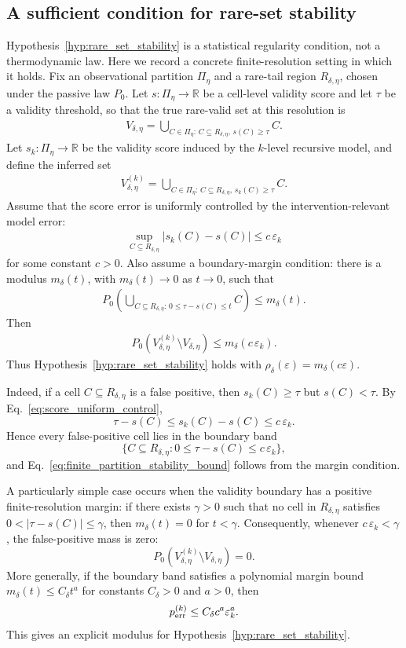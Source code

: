 \documentclass[
  aps,
  prresearch,
  reprint,
  amsmath,
  amssymb,
  superscriptaddress,
  nofootinbib,
  longbibliography
]{revtex4-2}
\def\EQSP{3pt}
\newcommand{\cgather}[2][\EQSP]{\begingroup\setlength\abovedisplayskip{#1}\setlength\belowdisplayskip{#1}\begin{gather} #2 \end{gather}\endgroup\noindent}
\begin{document}
\subsection{A sufficient condition for rare-set stability}
\label{app:rare_set_stability}

Hypothesis~\ref{hyp:rare_set_stability} is a statistical regularity condition, not a thermodynamic law. Here we record a concrete finite-resolution setting in which it holds. Fix an observational partition \(\Pi_\eta\) and a rare-tail region \(R_{\delta,\eta}\), chosen under the passive law \(P_0\). Let \(s:\Pi_\eta\to\mathbb R\) be a cell-level validity score and let \(\tau\) be a validity threshold, so that the true rare-valid set at this resolution is
\cgather{
    V_{\delta,\eta}
    =
    \bigcup_{C\in\Pi_\eta:\, C\subseteq R_{\delta,\eta},\, s(C)\geq \tau} C .
}
Let \(s_k:\Pi_\eta\to\mathbb R\) be the validity score induced by the \(k\)-level recursive model, and define the inferred set
\cgather{
    V_{\delta,\eta}^{(k)}
    =
    \bigcup_{C\in\Pi_\eta:\, C\subseteq R_{\delta,\eta},\, s_k(C)\geq \tau} C .
}
Assume that the score error is uniformly controlled by the intervention-relevant model error:
\cgather{
    \sup_{C\subseteq R_{\delta,\eta}}
    |s_k(C)-s(C)|
    \leq c\,\varepsilon_k
    \label{eq:score_uniform_control}
}
for some constant \(c>0\). Also assume a boundary-margin condition: there is a modulus \(m_\delta(t)\), with \(m_\delta(t)\to0\) as \(t\to0\), such that
\cgather{
    P_0\!\left(
    \bigcup_{C\subseteq R_{\delta,\eta}:\, 0\leq \tau-s(C)\leq t} C
    \right)
    \leq m_\delta(t).
    \label{eq:rare_boundary_margin}
}
Then
\cgather{
    P_0\!\left(V_{\delta,\eta}^{(k)}\setminus V_{\delta,\eta}\right)
    \leq
    m_\delta(c\,\varepsilon_k).
    \label{eq:finite_partition_stability_bound}
}
Thus Hypothesis~\ref{hyp:rare_set_stability} holds with
\(\rho_\delta(\varepsilon)=m_\delta(c\varepsilon)\).

Indeed, if a cell \(C\subseteq R_{\delta,\eta}\) is a false positive, then \(s_k(C)\geq\tau\) but \(s(C)<\tau\). By Eq.~\eqref{eq:score_uniform_control},
\[
    \tau-s(C)
    \leq
    s_k(C)-s(C)
    \leq
    c\,\varepsilon_k .
\]
Hence every false-positive cell lies in the boundary band
\[
    \{C\subseteq R_{\delta,\eta}: 0\leq \tau-s(C)\leq c\,\varepsilon_k\},
\]
and Eq.~\eqref{eq:finite_partition_stability_bound} follows from the margin condition.

A particularly simple case occurs when the validity boundary has a positive finite-resolution margin: if there exists \(\gamma>0\) such that no cell in \(R_{\delta,\eta}\) satisfies \(0<|\tau-s(C)|\leq\gamma\), then \(m_\delta(t)=0\) for \(t<\gamma\). Consequently, whenever \(c\,\varepsilon_k<\gamma\), the false-positive mass is zero:
\[
    P_0\!\left(V_{\delta,\eta}^{(k)}\setminus V_{\delta,\eta}\right)=0.
\]
More generally, if the boundary band satisfies a polynomial margin bound \(m_\delta(t)\leq C_\delta t^a\) for constants \(C_\delta>0\) and \(a>0\), then
\[
    p_{\rm err}^{(k)}
    \leq
    C_\delta c^a \varepsilon_k^a .
\]
This gives an explicit modulus for Hypothesis~\ref{hyp:rare_set_stability}.
\end{document}

